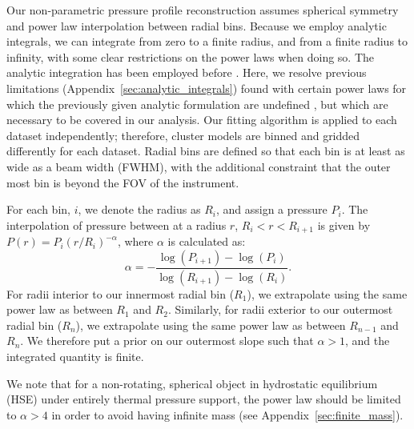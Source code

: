 \documentclass[twocolumn,traditabstract]{aa}
\begin{document}
Our non-parametric pressure profile reconstruction assumes spherical symmetry and power law interpolation between radial bins.
Because we employ analytic integrals, we can integrate from zero to a finite radius, and from a finite radius to infinity,
with some clear restrictions on the power
laws when doing so. The analytic integration has been employed before \citep[e.g.][]{vikhlinin2001a,korngut2011,sarazin2016}.
Here, we resolve  previous limitations (Appendix~\ref{sec:analytic_integrals}) found with certain power laws for which the
previously given analytic formulation are undefined \citep{korngut2011,sarazin2016}, but which are necessary to be covered
in our analysis.
Our fitting algorithm is applied
to each dataset independently; therefore, cluster models are binned and gridded differently for each dataset.
Radial bins are defined so that
each bin is at least as wide as a beam width (FWHM), with the additional constraint that the outer most bin
is beyond the FOV of the instrument.

For each bin, $i$, we denote the radius as $R_i$, and assign a pressure $P_i$. The interpolation of pressure
between at a radius $r$, $R_i < r < R_{i+1}$ is given by $P(r) = P_i (r/R_{i})^{-\alpha}$, where $\alpha$ is
calculated as:
\begin{equation}
  \alpha = -\frac{\log(P_{i+1}) - \log(P_i)}{\log(R_{i+1}) - \log(R_i)}.
\end{equation}
For radii interior to our innermost radial bin ($R_1$), we extrapolate using the same power law as between $R_1$ and
$R_2$. Similarly, for radii exterior to our outermost radial bin ($R_n$), we extrapolate using the same power law as
between $R_{n-1}$ and $R_n$. We therefore put a prior on our outermost slope such that $\alpha > 1$, and the integrated
quantity is finite.

We note that for a non-rotating, spherical object in hydrostatic equilibrium (HSE) under entirely thermal pressure
support, the power law should be
limited to $\alpha >4$ in order to avoid having infinite mass (see Appendix~\ref{sec:finite_mass}).
\end{document}
